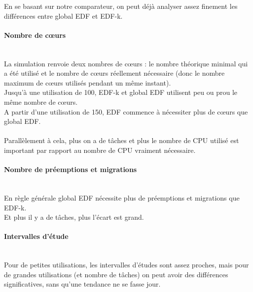 \documentclass[a4paper,10pt]{article}
\begin{document}
 	En se basant sur notre comparateur, on peut déjà analyser assez finement les différences entre global EDF et EDF-k.\\
	
	\paragraph*{Nombre de cœurs}~\\
		La simulation renvoie deux nombres de cœurs : le nombre théorique minimal qui a été utilisé et le nombre de cœurs réellement nécessaire (donc le nombre maximum de cœurs utilisés pendant un même instant).\\
		
		Jusqu'à une utilisation de 100, EDF-k et global EDF utilisent peu ou prou le même nombre de cœurs.\\
		A partir d'une utilisation de 150, EDF commence à nécessiter plus de cœurs que global EDF.\\
		~\\
		Parallèlement à cela, plus on a de tâches et plus le nombre de CPU utilisé est important par rapport au nombre de CPU vraiment nécessaire.
		
	\paragraph*{Nombre de préemptions et migrations}~\\

		En règle générale global EDF nécessite plus de préemptions et migrations que EDF-k.\\
		Et plus il y a de tâches, plus l'écart est grand.
		
	\paragraph*{Intervalles d'étude}~\\
		Pour de petites utilisations, les intervalles d'études sont assez proches, mais pour de grandes utilisations (et nombre de tâches) on peut avoir des différences significatives, sans qu'une tendance ne se fasse jour.
		
\end{document}
